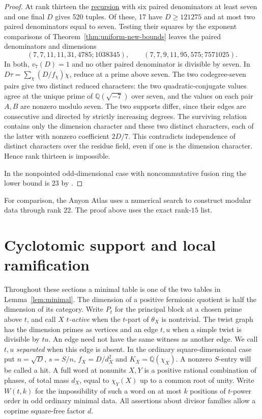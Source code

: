 \documentclass[11pt,a4paper]{article}
\numberwithin{equation}{section}
\theoremstyle{remark}
\newcommand{\QQ}{\mathbb Q}
\begin{document}
\begin{proof}
At rank thirteen the \href{https://github.com/sebastienpalcoux/WGT-fusion-categories/blob/f7f9f9a02f3116e61eb9dca4eebfed77001494e8/code/verify_odd13.py}{recursion} with six paired denominators at
least seven and one final $D$ gives 520 tuples. Of these, 17 have
$D\ge121275$ and at most two paired denominators equal to seven.
Testing their squares by the exponent comparisons of
Theorem~\ref{thm:uniform-new-bounds} leaves the paired denominators
and dimensions
\[
 (7,7,11,11,31,4785;1038345),\qquad
 (7,7,9,11,95,575;7571025).
\]
In both, $v_7(D)=1$ and no other paired denominator is divisible by
seven. In $D\tau=\sum_\chi (D/f_\chi)\chi$, reduce at a prime above
seven. The two codegree-seven pairs give two distinct reduced
characters: the two quadratic-conjugate values agree at the unique prime of $\QQ(\sqrt{-7})$ over seven, and
the values on each pair $A,B$ are nonzero modulo seven. The two
supports differ, since their edges are consecutive and directed by
strictly increasing degrees. The surviving relation contains only the
dimension character and these two distinct characters, each of the
latter with nonzero coefficient $2D/7$. This contradicts independence
of distinct characters over the residue field, even if one is the
dimension character. Hence rank thirteen is impossible.
\par In the nonpointed odd-dimensional case with noncommutative fusion ring the lower bound is $23$ by \cite[Theorem~1.8]{ABDPIntegral}. 
\end{proof}

For comparison, the Anyon Atlas \cite[Section~3]{AnyonAtlas} uses a numerical search to construct modular data through rank $22$. The proof above uses the exact rank-$15$ list.

\section{Cyclotomic support and local ramification}\label{found:group:support}
Throughout these sections a minimal table is one of the two tables in Lemma~\ref{lem:minimal}.
The dimension of a positive fermionic quotient is half the dimension of its category.
Write $P_t$ for the principal block at a chosen prime above $t$, and call $X$ \emph{$t$-active} when the $t$-part of $\theta_X$ is nontrivial.
The twist graph has the dimension primes as vertices and an edge $t,u$ when a simple twist is divisible by $tu$.
An edge need not have the same witness as another edge. We call $t,u$ \emph{separated} when this edge is absent.
In the ordinary square-dimensional case put $n=\sqrt D$, $s=S/n$, $f_X=D/d_X^2$ and $K_X=\QQ(\chi_X)$.
A nonzero $S$-entry will be called a hit. A full word at nonunits $X,Y$ is a positive rational combination of phases, of total mass $d_X$, equal to $\chi_Y(X)$ up to a common root of unity.
Write $W(t,k)$ for the impossibility of such a word on at most $k$ positions of $t$-power order in odd ordinary minimal data.
All assertions about divisor families allow a coprime square-free factor $d$.
\end{document}
